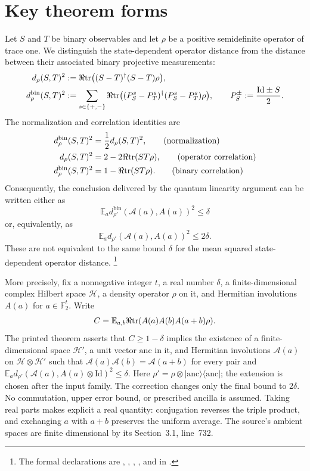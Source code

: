 \documentclass[11pt]{article}
\newcommand{\dbin}{d^{\mathrm{bin}}}
\newcommand{\Id}{\mathrm{Id}}
\begin{document}
\section{Key theorem forms}

Let $S$ and $T$ be binary observables and let $\rho$ be a positive
semidefinite operator of trace one.  We distinguish the state-dependent
operator distance from the distance between their associated binary projective
measurements:
\begin{align*}
  d_\rho(S,T)^2
    &:= \Re\tr\big((S-T)^\dagger(S-T)\rho\big), \\
  \dbin_\rho(S,T)^2
    &:= \sum_{s\in\{+,-\}}
      \Re\tr\big((P_S^s-P_T^s)^\dagger
                       (P_S^s-P_T^s)\rho\big),
  \qquad P_S^\pm := \frac{\Id\pm S}{2}.
\end{align*}
The normalization and correlation identities are
\begin{align}
  \dbin_\rho(S,T)^2 &= \frac12 d_\rho(S,T)^2,
    \tag{normalization}\label{eq:normalization}\\
  d_\rho(S,T)^2
    &= 2-2\Re\tr(ST\rho),
    \tag{operator correlation}\label{eq:operator-correlation}\\
  \dbin_\rho(S,T)^2
    &= 1-\Re\tr(ST\rho).
    \tag{binary correlation}\label{eq:binary-correlation}
\end{align}
Consequently, the conclusion delivered by the quantum linearity argument can
be written either as
\[
  \mathbb E_a\dbin_{\rho'}(\mathcal A(a),A(a))^2\leq\delta
\]
or, equivalently, as
\[
  \mathbb E_a d_{\rho'}(\mathcal A(a),A(a))^2\leq2\delta.
\]
These are not equivalent to the same bound $\delta$ for the mean squared
state-dependent operator distance.%
\footnote{The formal declarations are ,
,
,
, and
 in
.}

More precisely, fix a nonnegative integer $t$, a real number $\delta$, a
finite-dimensional complex Hilbert space $\mathcal H$, a density operator
$\rho$ on it, and Hermitian involutions $A(a)$ for $a\in\mathbb F_2^t$.
Write
\[
 C=\mathbb E_{a,b}\Re\mathrm{tr}(A(a)A(b)A(a+b)\rho).
\]
The printed theorem asserts that $C\geq1-\delta$ implies the existence of
a finite-dimensional space $\mathcal H'$, a unit vector $\mathrm{anc}$ in it,
and Hermitian involutions $\mathcal A(a)$ on $\mathcal H\otimes\mathcal H'$
such that $\mathcal A(a)\mathcal A(b)=\mathcal A(a+b)$ for every pair and
$\mathbb E_a d_{\rho'}(\mathcal A(a),A(a)\otimes\Id)^2\leq\delta$.
Here $\rho'=\rho\otimes|\mathrm{anc}\rangle\langle\mathrm{anc}|$; the
extension is chosen after the input family. The correction changes only
the final bound to $2\delta$. No commutation, upper error bound, or prescribed
ancilla is assumed. Taking real parts makes explicit a real quantity:
conjugation reverses the triple product, and exchanging $a$ with $a+b$
preserves the uniform average. The source's ambient spaces are finite
dimensional by its Section~3.1, line~732.
\end{document}
